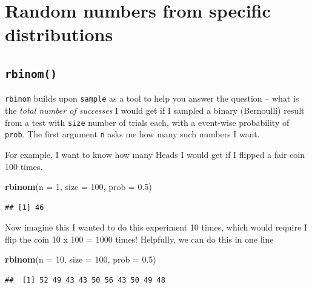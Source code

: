 \documentclass[
]{book}
\newenvironment{Shaded}{\begin{snugshade}}{\end{snugshade}}
\newcommand{\DataTypeTok}[1]{\textcolor[rgb]{0.13,0.29,0.53}{#1}}
\newcommand{\DecValTok}[1]{\textcolor[rgb]{0.00,0.00,0.81}{#1}}
\newcommand{\FloatTok}[1]{\textcolor[rgb]{0.00,0.00,0.81}{#1}}
\newcommand{\KeywordTok}[1]{\textcolor[rgb]{0.13,0.29,0.53}{\textbf{#1}}}
\newcommand{\NormalTok}[1]{#1}
\theoremstyle{definition}
\theoremstyle{definition}
\theoremstyle{definition}
\theoremstyle{definition}
\theoremstyle{remark}
\begin{document}
\hypertarget{random-numbers-from-specific-distributions}{%
\section{Random numbers from specific distributions}\label{random-numbers-from-specific-distributions}}

\hypertarget{rbinom}{%
\subsection*{\texorpdfstring{\texttt{rbinom()}}{rbinom()}}\label{rbinom}}

\texttt{rbinom} builds upon \texttt{sample} as a tool to help you answer the question -- what is the \emph{total number of successes} I would get if I sampled a binary (Bernoulli) result from a test with \texttt{size} number of trials each, with a event-wise probability of \texttt{prob}. The first argument \texttt{n} asks me how many such numbers I want.

For example, I want to know how many Heads I would get if I flipped a fair coin 100 times.

\begin{Shaded}
\begin{Highlighting}[]
\KeywordTok{rbinom}\NormalTok{(}\DataTypeTok{n =} \DecValTok{1}\NormalTok{, }\DataTypeTok{size =} \DecValTok{100}\NormalTok{, }\DataTypeTok{prob =} \FloatTok{0.5}\NormalTok{)}
\end{Highlighting}
\end{Shaded}

\begin{verbatim}
## [1] 46
\end{verbatim}

Now imagine this I wanted to do this experiment 10 times, which would require I flip the coin 10 x 100 = 1000 times! Helpfully, we can do this in one line

\begin{Shaded}
\begin{Highlighting}[]
\KeywordTok{rbinom}\NormalTok{(}\DataTypeTok{n =} \DecValTok{10}\NormalTok{, }\DataTypeTok{size =} \DecValTok{100}\NormalTok{, }\DataTypeTok{prob =} \FloatTok{0.5}\NormalTok{)}
\end{Highlighting}
\end{Shaded}

\begin{verbatim}
##  [1] 52 49 43 43 50 56 43 50 49 48
\end{verbatim}
\end{document}
